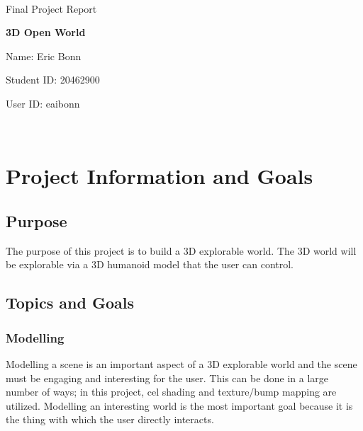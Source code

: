 \documentclass {article}
\begin{document}
\begin{center}
\Large
$ $
\newline
\newline
\newline
\newline
\newline
\newline
\newline
\newline
\newline
\newline
\newline
\newline

Final Project Report

\textbf{3D Open World}

Name: Eric Bonn

Student ID: 20462900

User ID: eaibonn
\pagebreak

\tableofcontents

\end{center}
\vfill ~\vfill~
\newpage

\clearpage

\section{Project Information and Goals}

\subsection{Purpose}
    The purpose of this project is to build a 3D explorable world. The 3D world will be explorable via a 3D humanoid model that the user can control.

\subsection{Topics and Goals}
    \subsubsection{Modelling}
    Modelling a scene is an important aspect of a 3D explorable world and the scene must be engaging and interesting for the user. This can be done in a large number of ways; in this project, cel shading and texture/bump mapping are utilized. Modelling an interesting world is the most important goal because it is the thing with which the user directly interacts.
\end{document}
